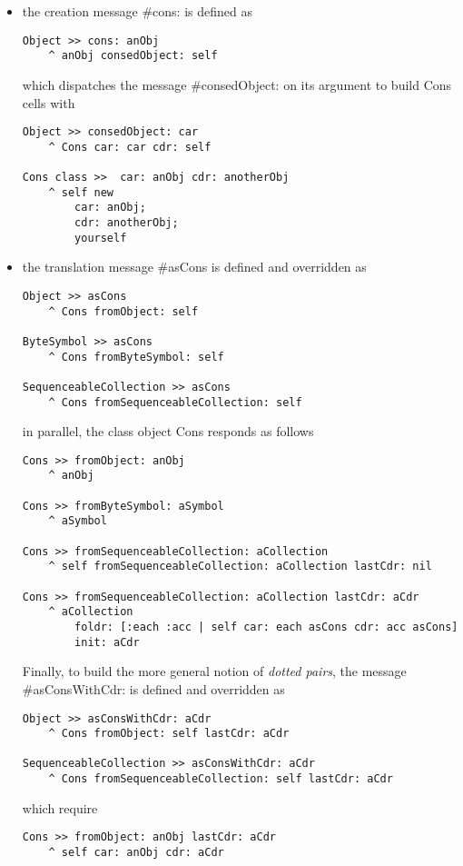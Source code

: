 \documentclass[a4paper,11pt]{article}
\newcommand{\ct}[1]{{\textsf{#1}}\xspace}
\begin{document}
\begin{itemize}
\item the creation message \ct{\#cons:} is defined as
\begin{verbatim}
Object >> cons: anObj
    ^ anObj consedObject: self
\end{verbatim}
which dispatches the message \ct{\#consedObject:} on its argument to build
\ct{Cons} cells with
\begin{verbatim}
Object >> consedObject: car
    ^ Cons car: car cdr: self

Cons class >>  car: anObj cdr: anotherObj
    ^ self new
        car: anObj;
        cdr: anotherObj;
        yourself
\end{verbatim}

\item the translation message \ct{\#asCons} is defined and overridden as
\begin{verbatim}
Object >> asCons
    ^ Cons fromObject: self

ByteSymbol >> asCons
    ^ Cons fromByteSymbol: self

SequenceableCollection >> asCons
    ^ Cons fromSequenceableCollection: self
\end{verbatim}
in parallel, the class object \ct{Cons} responds as follows
\begin{verbatim}
Cons >> fromObject: anObj
    ^ anObj

Cons >> fromByteSymbol: aSymbol
    ^ aSymbol

Cons >> fromSequenceableCollection: aCollection
    ^ self fromSequenceableCollection: aCollection lastCdr: nil

Cons >> fromSequenceableCollection: aCollection lastCdr: aCdr
    ^ aCollection
        foldr: [:each :acc | self car: each asCons cdr: acc asCons]
        init: aCdr
\end{verbatim}
Finally, to build the more general notion of \textit{dotted pairs},
the message \ct{\#asConsWithCdr:} is defined and overridden as
\begin{verbatim}
Object >> asConsWithCdr: aCdr
    ^ Cons fromObject: self lastCdr: aCdr

SequenceableCollection >> asConsWithCdr: aCdr
    ^ Cons fromSequenceableCollection: self lastCdr: aCdr
\end{verbatim}
which require
\begin{verbatim}
Cons >> fromObject: anObj lastCdr: aCdr
    ^ self car: anObj cdr: aCdr
\end{verbatim}

\end{itemize}
\end{document}
